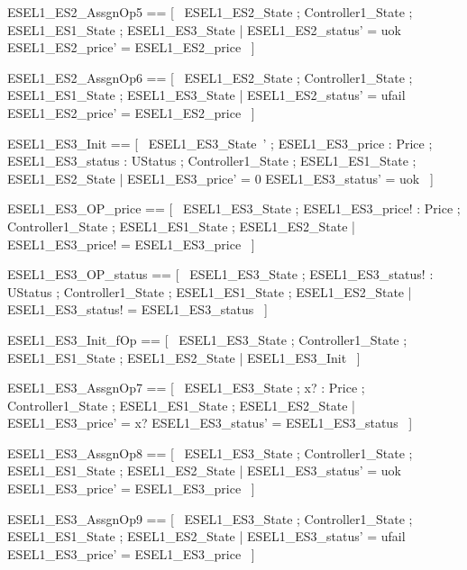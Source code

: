 \documentclass{article}
\begin{document}
\begin{zed}
	ESEL1\_ES2\_AssgnOp5 == [~  \Delta ESEL1\_ES2\_State ; \Xi Controller1\_State ; \Xi ESEL1\_ES1\_State ; \Xi ESEL1\_ES3\_State | ESEL1\_ES2\_status' = uok \land ESEL1\_ES2\_price' = ESEL1\_ES2\_price  ~]
\end{zed}

\begin{zed}
	ESEL1\_ES2\_AssgnOp6 == [~  \Delta ESEL1\_ES2\_State ; \Xi Controller1\_State ; \Xi ESEL1\_ES1\_State ; \Xi ESEL1\_ES3\_State | ESEL1\_ES2\_status' = ufail \land ESEL1\_ES2\_price' = ESEL1\_ES2\_price  ~]
\end{zed}

\begin{zed}
	ESEL1\_ES3\_Init == [~  ESEL1\_ES3\_State~' ; ESEL1\_ES3\_price : Price ; ESEL1\_ES3\_status : UStatus ; \Xi Controller1\_State ; \Xi ESEL1\_ES1\_State ; \Xi ESEL1\_ES2\_State | ESEL1\_ES3\_price' = 0 \land ESEL1\_ES3\_status' = uok  ~]
\end{zed}

\begin{zed}
	ESEL1\_ES3\_OP\_price == [~  \Xi ESEL1\_ES3\_State ; ESEL1\_ES3\_price! : Price ; \Xi Controller1\_State ; \Xi ESEL1\_ES1\_State ; \Xi ESEL1\_ES2\_State | ESEL1\_ES3\_price! = ESEL1\_ES3\_price  ~]
\end{zed}

\begin{zed}
	ESEL1\_ES3\_OP\_status == [~  \Xi ESEL1\_ES3\_State ; ESEL1\_ES3\_status! : UStatus ; \Xi Controller1\_State ; \Xi ESEL1\_ES1\_State ; \Xi ESEL1\_ES2\_State | ESEL1\_ES3\_status! = ESEL1\_ES3\_status  ~]
\end{zed}

\begin{zed}
	ESEL1\_ES3\_Init\_fOp == [~  \Xi ESEL1\_ES3\_State ; \Xi Controller1\_State ; \Xi ESEL1\_ES1\_State ; \Xi ESEL1\_ES2\_State | \lnot \pre ESEL1\_ES3\_Init  ~]
\end{zed}

\begin{zed}
	ESEL1\_ES3\_AssgnOp7 == [~  \Delta ESEL1\_ES3\_State ; x? : Price ; \Xi Controller1\_State ; \Xi ESEL1\_ES1\_State ; \Xi ESEL1\_ES2\_State | ESEL1\_ES3\_price' = x? \land ESEL1\_ES3\_status' = ESEL1\_ES3\_status  ~]
\end{zed}

\begin{zed}
	ESEL1\_ES3\_AssgnOp8 == [~  \Delta ESEL1\_ES3\_State ; \Xi Controller1\_State ; \Xi ESEL1\_ES1\_State ; \Xi ESEL1\_ES2\_State | ESEL1\_ES3\_status' = uok \land ESEL1\_ES3\_price' = ESEL1\_ES3\_price  ~]
\end{zed}

\begin{zed}
	ESEL1\_ES3\_AssgnOp9 == [~  \Delta ESEL1\_ES3\_State ; \Xi Controller1\_State ; \Xi ESEL1\_ES1\_State ; \Xi ESEL1\_ES2\_State | ESEL1\_ES3\_status' = ufail \land ESEL1\_ES3\_price' = ESEL1\_ES3\_price  ~]
\end{zed}
\end{document}

